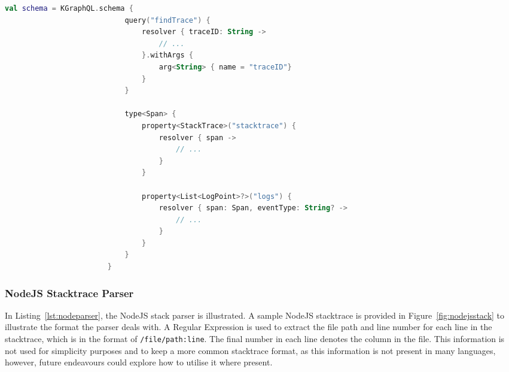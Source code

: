 \documentclass[12pt,pdftex,titlepage]{report}
\begin{document}
                \begin{spacing}{1.0}
                    \begin{lstlisting}[caption=Kotlin snippet of defining the GraphQL schema using the Kotlin DSL., language=Kotlin, gobble=24, label={lst:kgraphql}]
                        val schema = KGraphQL.schema { 
                            query("findTrace") { 
                                resolver { traceID: String ->
                                    // ...
                                }.withArgs { 
                                    arg<String> { name = "traceID"}
                                }
                            }

                            type<Span> {
                                property<StackTrace>("stacktrace") { 
                                    resolver { span ->
                                        // ...
                                    }
                                }

                                property<List<LogPoint>?>("logs") {
                                    resolver { span: Span, eventType: String? ->
                                        // ...
                                    }
                                }
                            }
                        }                
                    \end{lstlisting}
                \end{spacing}

                \subsubsection{NodeJS Stacktrace Parser}
                \label{sec:nodeparser}
                    In Listing~\ref{lst:nodeparser}, the NodeJS stack parser is illustrated. A sample NodeJS stacktrace is provided in Figure~\ref{fig:nodejsstack} to illustrate the
                    format the parser deals with. A Regular Expression is used to extract the file path and line number for each line
                    in the stacktrace, which is in the format of \texttt{/file/path:line}. The final number in each line denotes the column in the file. This information is not 
                    used for simplicity purposes and to keep a more common stacktrace format, as this information is not present in many languages, however, future endeavours could
                    explore how to utilise it where present.
                    
\end{document}
